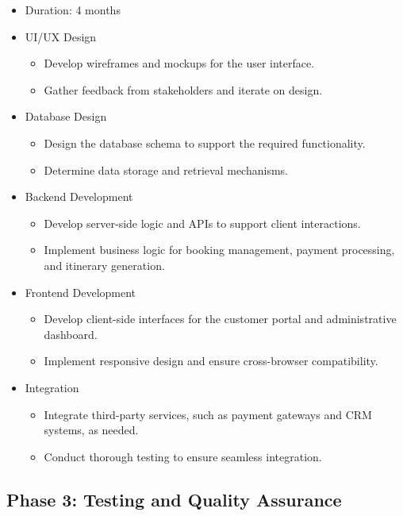 \documentclass[12pt]{article}
\begin{document}
\begin{itemize}
    \item Duration: 4 months
    \item UI/UX Design
        \begin{itemize}
            \item Develop wireframes and mockups for the user interface.
            \item Gather feedback from stakeholders and iterate on design.
        \end{itemize}
    \item Database Design
        \begin{itemize}
            \item Design the database schema to support the required functionality.
            \item Determine data storage and retrieval mechanisms.
        \end{itemize}
    \item Backend Development
        \begin{itemize}
            \item Develop server-side logic and APIs to support client interactions.
            \item Implement business logic for booking management, payment processing, and itinerary generation.
        \end{itemize}
    \item Frontend Development
        \begin{itemize}
            \item Develop client-side interfaces for the customer portal and administrative dashboard.
            \item Implement responsive design and ensure cross-browser compatibility.
        \end{itemize}
    \item Integration
        \begin{itemize}
            \item Integrate third-party services, such as payment gateways and CRM systems, as needed.
            \item Conduct thorough testing to ensure seamless integration.
        \end{itemize}
\end{itemize}

\subsection*{\fontsize{13}{0}\selectfont Phase 3: Testing and Quality Assurance}
\end{document}
